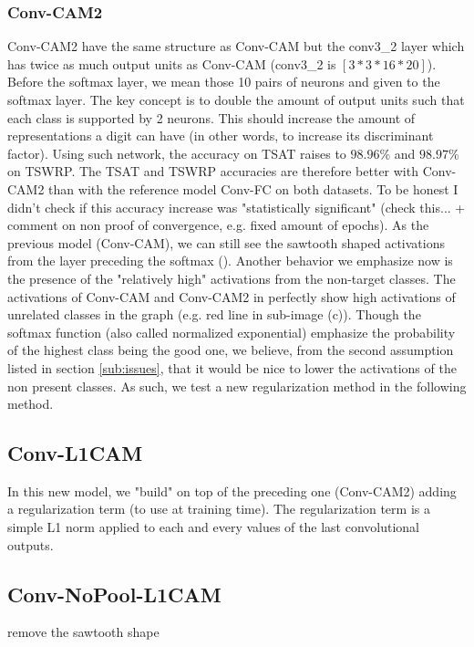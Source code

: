 			\subsubsection{Conv-CAM2}
			\label{ssub:conv_cam2}
				Conv-CAM2 have the same structure as Conv-CAM but the conv3\_2 layer which has twice as much output units as Conv-CAM (conv3\_2 is $[3*3*16*20]$). Before the softmax layer, we mean those 10 pairs of neurons and given to the softmax layer. The key concept is to double the amount of output units such that each class is supported by 2 neurons. This should increase the amount of representations a digit can have (in other words, to increase its discriminant factor).
				Using such network, the accuracy on TSAT raises to $98.96\%$ and $98.97\%$ on TSWRP. The TSAT and TSWRP accuracies are therefore better with Conv-CAM2 than with the reference model Conv-FC on both datasets. To be honest I didn't check if this accuracy increase was "statistically significant" (check this... + comment on non proof of convergence, e.g. fixed amount of epochs).
				As the previous model (Conv-CAM), we can still see the sawtooth shaped activations from the layer preceding the softmax (). Another behavior we emphasize now is the presence of the "relatively high" activations from the non-target classes. The activations of Conv-CAM and Conv-CAM2 in  perfectly show high activations of unrelated classes in the graph (e.g. red line in sub-image (c)). Though the softmax function (also called normalized exponential) emphasize the probability of the highest class being the good one, we believe, from the second assumption listed in section \ref{sub:issues}, that it would be nice to lower the activations of the non present classes.
				As such, we test a new regularization method in the following method.
		

			
			\subsection{Conv-L1CAM}
			\label{sub:conv_l1cam}
				In this new model, we "build" on top of the preceding one (Conv-CAM2) adding a regularization term (to use at training time). The regularization term is a simple L1 norm applied to each and every values of the last convolutional outputs.


			\subsection{Conv-NoPool-L1CAM}
			\label{sub:conv_nopool_l1cam}
				remove the sawtooth shape

